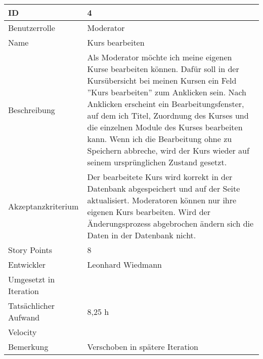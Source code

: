 \begin{tabularx}{\textwidth}{|p{}|X|}
	\hline
	ID & 4\\
	\hline
	Benutzerrolle & Moderator\\
	\hline
	Name & Kurs bearbeiten\\
	\hline
	Beschreibung & Als Moderator möchte ich meine eigenen Kurse bearbeiten können. Dafür soll in der Kursübersicht bei meinen Kursen ein Feld ''Kurs bearbeiten'' zum Anklicken sein. Nach Anklicken erscheint ein Bearbeitungsfenster, auf dem ich Titel, Zuordnung des Kurses und die einzelnen Module des Kurses bearbeiten kann. Wenn ich die Bearbeitung ohne zu Speichern abbreche, wird der Kurs wieder auf seinem ursprünglichen Zustand gesetzt.\\
	\hline
	Akzeptanzkriterium & Der bearbeitete Kurs wird korrekt in der Datenbank abgespeichert und auf der Seite aktualisiert. Moderatoren können nur ihre eigenen Kurs bearbeiten. Wird der Änderungsprozess abgebrochen ändern sich die Daten in der Datenbank nicht.\\
	\hline
	Story Points & 8 \\
	\hline
	Entwickler & Leonhard Wiedmann \\
	\hline
	Umgesetzt in Iteration & \\
	\hline
	Tatsächlicher Aufwand & 8,25 h \\
	\hline
	Velocity & \\
	\hline
	Bemerkung & Verschoben in spätere Iteration\\
	\hline
\end{tabularx}
\vspace{20pt}
